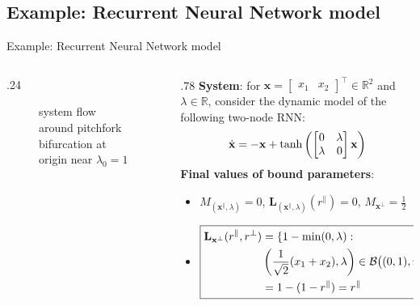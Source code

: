 \documentclass[11pt]{beamer}
\begin{document}
\begin{frame}{\section{Example: Recurrent Neural Network model}Example: Recurrent Neural Network model}
    \begin{columns}[T] %
        \begin{column}{.24\textwidth}
            \begin{figure}[ht!]
                \centering
                
                
                \caption{system flow around pitchfork bifurcation at origin near \(\lambda_0=1\)}
            \end{figure}
        \end{column}%
        \hfill%
        \begin{column}{.78\textwidth}
            \textbf{System}: for \(\mathbf{x}=\begin{bmatrix}x_1&x_2\end{bmatrix}^{\top}\in\mathbb{R}^2\) and \(\lambda\in\mathbb{R}\), consider the dynamic model of the following two-node RNN:
            \vspace{-2mm}\[
                \dot{\mathbf{x}} = -\mathbf{x}+\tanh\left(\begin{bmatrix}0&\lambda\\\lambda&0\end{bmatrix}\mathbf{x}\right)
            \vspace{-2mm}\]
            \textbf{Final values of bound parameters}:
            \begin{itemize}
                \item \(\boxed{M_{(\mathbf{x}^\parallel,\lambda)} = 0}\), \(\boxed{\mathbf{L}_{(\mathbf{x}^\parallel,\lambda)}(r^\parallel)=0}\), \(\boxed{M_{\mathbf{x}^\perp} = \frac{1}{2}}\)
                \item \(\boxed{\begin{aligned}
                    \mathbf{L}_{\mathbf{x}^\perp}(r^\parallel,r^\perp) &= \tiny\{1-\min(0,\lambda):\\&\left(\frac{1}{\sqrt{2}}(x_1+x_2),\lambda\right)\in\mathcal{B}\big((0,1),r^\parallel\big)\}\\&=1-(1-r^\parallel)=r^\parallel
                \end{aligned}}\)
            \end{itemize}
        \end{column}%
        \hfill
    \end{columns}
\end{frame}
\end{document}
